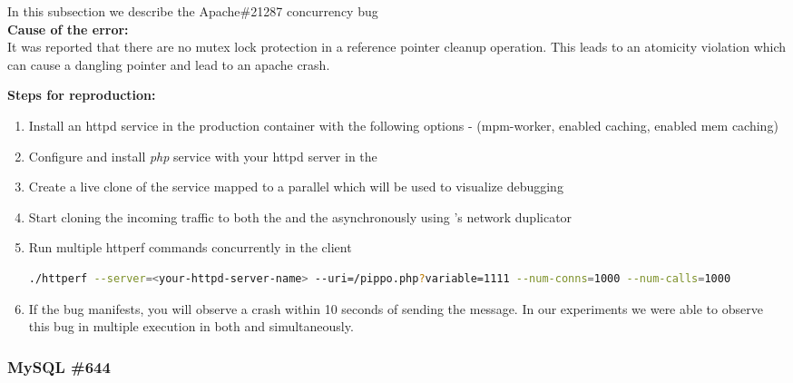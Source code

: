 In this subsection we describe the Apache\#21287 concurrency bug \\

\noindent \textbf{Cause of the error:} \\

It was reported that there are no mutex lock protection in a reference pointer cleanup operation. 
This leads to an atomicity violation which can cause a dangling pointer and lead to an apache crash.

\noindent \textbf{Steps for reproduction:} \\

\begin{adjustwidth}{0.5cm}{}
	\begin{enumerate}
		\item Install an httpd service in the production container with the following options - (mpm-worker, enabled caching, enabled mem caching)
		\item Configure and install \emph{php} service with your httpd server in the \productioncontainer
		\item Create a live clone of the service mapped to a parallel \debugcontainer which will be used to visualize debugging
		\item Start cloning the incoming traffic to both the \productioncontainer and the \debugcontainer asynchronously using \parikshan's network duplicator
		
		\item Run multiple httperf commands concurrently in the client
		
		\begin{lstlisting}[language=sh]
		   ./httperf --server=<your-httpd-server-name> --uri=/pippo.php?variable=1111 --num-conns=1000 --num-calls=1000
		\end{lstlisting}
		
		\item If the bug manifests, you will observe a crash within 10 seconds of sending the message. In our experiments we were able to observe this bug in multiple execution in both \productioncontainer and \debugcontainer simultaneously.
		
	\end{enumerate}
\end{adjustwidth}


\subsubsection{MySQL \#644}

